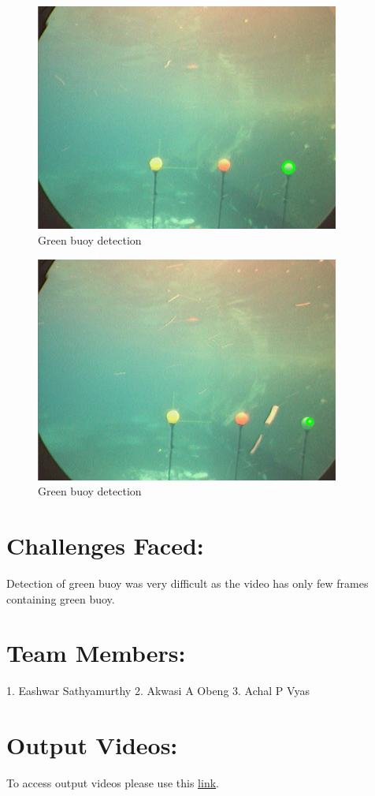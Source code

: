 \documentclass[12pt]{article}
\begin{document}
\newpage
\begin{figure}[h]
    \centering
    \includegraphics[width=10cm]{greenbuoydetection}
    \caption{Green buoy detection}
    \label{fig:Green buoy detection}
\end{figure}
\begin{figure}[h]
    \centering
    \includegraphics[width=10cm]{greenbuoydetection1}
    \caption{Green buoy detection}
    \label{fig:Green buoy detection}
\end{figure}

\section{Challenges Faced:}
Detection of green buoy was very difficult as the video has only few frames containing green buoy.
\section{Team Members:}
1. Eashwar Sathyamurthy
2. Akwasi A Obeng
3. Achal P Vyas
\section{Output Videos:}
To access output videos please use this \href{https://drive.google.com/drive/folders/1u-9GdSQYNw-M6Cw1d2jZkYR8QPCDGkzQ?usp=sharing}{\underline{link}}.
\end{document}
